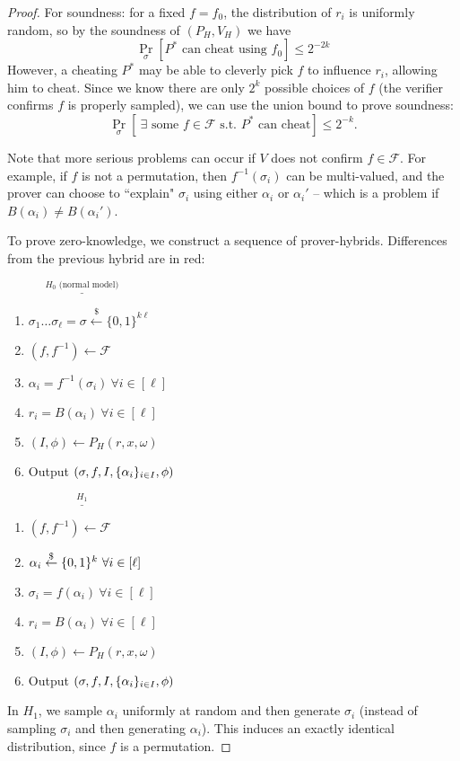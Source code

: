 \begin{proof}
For soundness: for a fixed $f = f_0$, the distribution of $r_i$ is
uniformly random, so by the soundness of $(P_H, V_H)$ we have
$$\Pr_\sigma[\text{$P^*$ can cheat using $f_0$}] \leq 2^{-2k}$$
However, a cheating $P^*$ may be able to cleverly pick $f$ to influence $r_i$,
allowing him to cheat. Since we know there are only $2^k$ possible choices of
$f$ (the verifier confirms $f$ is properly sampled), we can use the union bound
to prove soundness:
$$\Pr_\sigma[~\exists \text{ some $f \in \mathcal{F}$ s.t. $P^*$ can cheat}] \leq 2^{-k}.$$

Note that more serious problems can occur if $V$ does not confirm $f\in \mathcal{F}$. For example, if $f$ is not a permutation, then
$f^{-1}(\sigma_i)$ can be multi-valued, and the prover can choose to ``explain"
$\sigma_i$ using either $\alpha_i$ or $\alpha_i'$ -- which is a problem if
$B(\alpha_i) \neq B(\alpha_i')$.

To prove zero-knowledge, we construct a sequence of prover-hybrids.
Differences from the previous hybrid are in red:


\newcommand{\htitle}[1]{\vspace{0.3cm}$\overset{#1}{\underline{\hspace{5cm}}}$}
\newcommand{\diff}[1]{{\color{red} #1}}

\htitle{H_0 \text{ (normal model)}}
\begin{enumerate}
    \item $\sigma_1\hdots\sigma_\ell = \sigma \xleftarrow{\$} \{0,1\}^{k\ell}$
    \item $(f, f^{-1}) \gets \mathcal{F}$
    \item $\alpha_i = f^{-1}(\sigma_i) ~\forall i \in [\ell]$
    \item $r_i = B(\alpha_i) ~\forall i \in [\ell]$
    \item $(I, \phi) \gets P_H(r, x, \omega)$
    \item Output $(\sigma, f, I, \{\alpha_i\}_{i \in I}, \phi)$
\end{enumerate}

\htitle{H_1}
\begin{enumerate}
    \item $(f, f^{-1}) \gets \mathcal{F}$
    \item \diff{$\alpha_i \overset{\$}{\gets} \{0, 1\}^k ~\forall i \in [\ell]$}
    \item \diff{$\sigma_i = f(\alpha_i) ~\forall i \in [\ell]$}
    \item $r_i = B(\alpha_i) ~\forall i \in [\ell]$
    \item $(I, \phi) \gets P_H(r, x, \omega)$
    \item Output $(\sigma, f, I, \{\alpha_i\}_{i \in I}, \phi)$
\end{enumerate}
In $H_1$, we sample $\alpha_i$ uniformly at random and then generate $\sigma_i$ (instead of
sampling $\sigma_i$ and then generating $\alpha_i$). This induces an exactly identical distribution, since $f$
is a permutation.


\end{proof}
